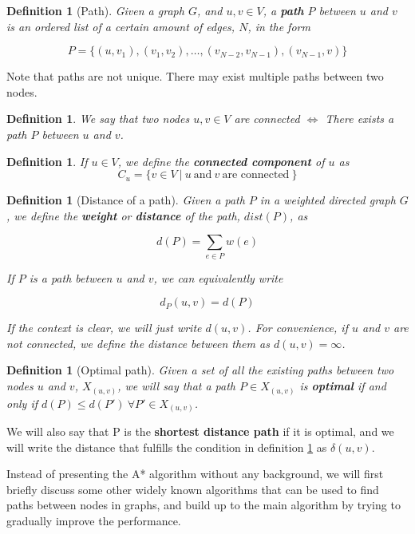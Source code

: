 \documentclass[12pt]{report}
\newtheorem{definition}[theorem]{Definition}
\begin{document}
\begin{definition}[Path]
Given a graph $G$, and $u, v \in V$, a \textbf{path} $P$ between $u$ and $v$ is an ordered list of a certain amount of edges, $N$, in the form

\[ P = \{(u,v_1), (v_1, v_2), \dots, (v_{N-2}, v_{N-1}), (v_{N-1}, v)\} \]

\end{definition}
Note that paths are not unique. There may exist multiple paths between two nodes.

\begin{definition}
We say that two nodes $u, v \in V$ are connected $\Longleftrightarrow$ There exists a path $P$ between $u$ and $v$.
\end{definition}

\begin{definition}
If $u \in V$, we define the \textbf{connected component} of $u$ as
\[ C_u = \{ v \in V\ |\ u \ \text{and} \ v \ \text{are connected}\  \} \]
\end{definition}

\begin{definition}[Distance of a path]
Given a path $P$ in a weighted directed graph $G$, we define the \textbf{weight} or \textbf{distance} of the path, $dist(P)$, as

\[ d(P) = \sum_{e \in P} w(e) \]

If $P$ is a path between $u$ and $v$, we can equivalently write

\[ d_P(u, v) = d(P) \]

If the context is clear, we will just write $d(u, v)$. For convenience, if $u$ and $v$ are not connected, we define the distance between them as $d(u, v) = \infty$.
\end{definition}

\begin{definition}[Optimal path]
\label{def:optimal}
Given a set of all the existing paths between two nodes $u$ and $v$, $X_{(u, v)}$, we will say that a path $P \in X_{(u,v)}$ is \textbf{optimal} if and only if $d(P) \le d(P') \ \forall P' \in X_{(u, v)}$.
\end{definition}

We will also say that P is the \textbf{shortest distance path} if it is optimal, and we will write the distance that fulfills the condition in definition \ref{def:optimal} as $\delta(u,v)$.


Instead of presenting the A* algorithm without any background, we will first briefly discuss some other widely known algorithms that can be used to find paths between nodes in graphs, and build up to the main algorithm by trying to gradually improve the performance.
\end{document}
